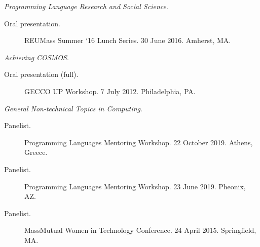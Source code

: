 \documentclass[10pt]{article}
\begin{document}
{\begin{description}
    \end{description}
    \vspace{10pt}
    \emph{Programming Language Research and Social Science}.
    \begin{description}
      \item[Oral presentation.] REUMass Summer `16 Lunch Series. 30 June 2016.  Amherst, MA.
    \end{description}
    \vspace{10pt}
    \emph{Achieving COSMOS}.
    \begin{description}
    \item[Oral presentation (full).]  GECCO UP Workshop. 7 July 2012. Philadelphia, PA.
    \end{description}
    \vspace{10pt}
    \emph{General Non-technical Topics in Computing}.
    \begin{description}
      \item[Panelist.] Programming Languages Mentoring Workshop. 22 October 2019. Athens, Greece.
      \item[Panelist.] Programming Languages Mentoring Workshop. 23 June 2019. Pheonix, AZ.
      \item[Panelist.] MassMutual Women in Technology Conference. 24 April 2015. Springfield, MA.
    \end{description}
}
\end{document}

